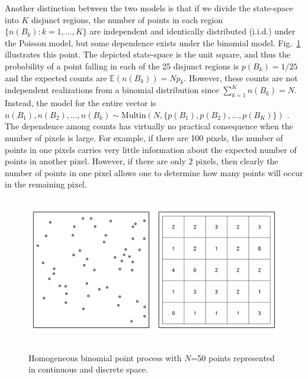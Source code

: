 Another distinction between the two models is that if we divide the
state-space into $K$ disjunct regions, the number of points in each
region $\{ n(B_k): k=1,\dots,K \}$ are
independent and identically distributed (i.i.d.) under the Poisson model,
but some dependence exists under the binomial model.
Fig.~\ref{state-space.fig.homo} illustrates this point.
The depicted state-space is the unit square, and thus the probability of a
point falling in each of the 25 disjunct regions is $p(B_k) = 1/25$ and
the expected counts are $\mathbb{E}(n(B_k)) = Np_k$.
However, these counts are not
independent realizations from a binomial distribution since $\sum_{k=1}^K
n(B_k) = N$. Instead, the model for the entire vector
is ${n(B_1), n(B_2), \dots, n(B_k)} \sim \mbox{Multin}(N, \{p(B_1), p(B_2), \dots,
p(B_K) \})$ \citep{illian_etal:2008}.
The dependence among counts has virtually
no practical consequence when the number of pixels is large. For
example, if there are 100 pixels, the number of points in one pixels
carries very little information about the expected number of points in another
pixel. However, if there are only 2 pixels, then clearly the number of
points in one pixel allows one to determine how many points will occur in the
remaining pixel.


\begin{figure}[ht!]
\centering
\includegraphics[width=5in,height=2.5in]{Ch11/figs/homoPlots}
\label{state-space.fig.homo}
\caption{Homogeneous binomial point process with $N$=50 points
  represented in continuous and discrete space.}
\end{figure}


